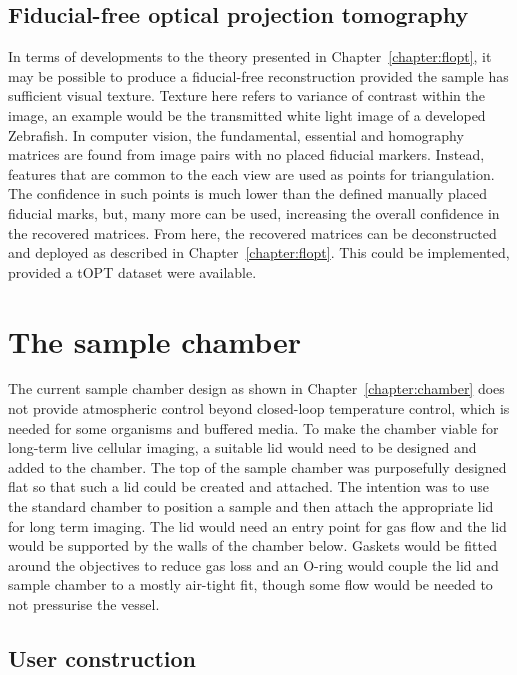 \subsection{Fiducial-free optical projection tomography}

In terms of developments to the theory presented in Chapter~\ref{chapter:flopt}, it may be possible to produce a fiducial-free reconstruction provided the sample has sufficient visual texture.
Texture here refers to variance of contrast within the image, an example would be the transmitted white light image of a developed Zebrafish.
In computer vision, the fundamental, essential and homography matrices are found from image pairs with no placed fiducial markers.
Instead, features that are common to the each view are used as points for triangulation.
The confidence in such points is much lower than the defined manually placed fiducial marks, but, many more can be used, increasing the overall confidence in the recovered matrices.
From here, the recovered matrices can be deconstructed and deployed as described in Chapter~\ref{chapter:flopt}.
This could be implemented, provided a \gls{tOPT} dataset were available.

\section{The sample chamber}

The current sample chamber design as shown in Chapter~\ref{chapter:chamber} does not provide atmospheric control beyond closed-loop temperature control, which is needed for some organisms and  buffered media.
To make the chamber viable for long-term live cellular imaging, a suitable lid would need to be designed and added to the chamber.
The top of the sample chamber was purposefully designed flat so that such a lid could be created and attached.
The intention was to use the standard chamber to position a sample and then attach the appropriate lid for long term imaging.
The lid would need an entry point for gas flow and the lid would be supported by the walls of the chamber below.
Gaskets would be fitted around the objectives to reduce gas loss and an O-ring would couple the lid and sample chamber to a mostly air-tight fit, though some flow would be needed to not pressurise the vessel.

\subsection{User construction}

